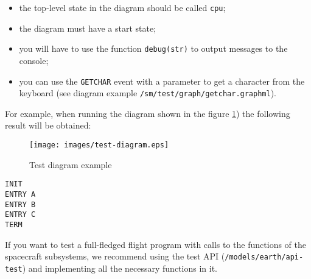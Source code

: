 \documentclass[12pt,a4paper]{article}
\begin{document}
\begin{itemize}
\item the top-level state in the diagram should be called \verb'cpu';
\item the diagram must have a start state;
\item you will have to use the function \verb'debug(str)' to output messages to the console;
\item you can use the \verb'GETCHAR' event with a parameter to get a character from the keyboard (see diagram example \verb'/sm/test/graph/getchar.graphml').
\end{itemize}

For example, when running the diagram shown in the figure \ref{Pic:TestDiagr}) the following result will be obtained:

\begin{figure}[tbh]
  \begin{center}
    \texttt{[image: images/test-diagram.eps]}
    \caption{Test diagram example}
    \label{Pic:TestDiagr}
  \end{center}
\end{figure}

\begin{verbatim}
INIT
ENTRY A
ENTRY B
ENTRY C
TERM
\end{verbatim}

If you want to test a full-fledged flight program with calls to the functions of the spacecraft subsystems, we recommend using the test API (\verb'/models/earth/api-test') and implementing all the necessary functions in it.
\end{document}
